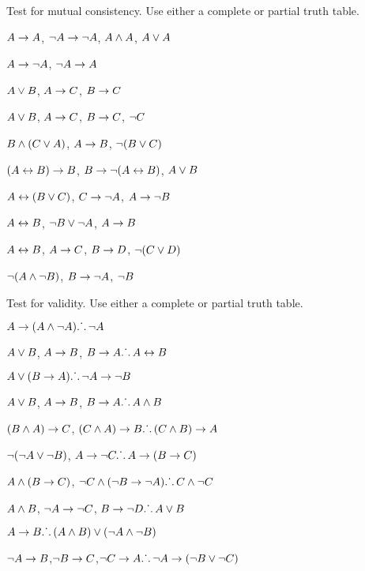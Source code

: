 \documentclass[PHIL101-Textbook.tex]{subfiles}
\begin{document}
\noindent\problempart
\label{pr.TT.consistent5}
Test for mutual consistency. Use either a complete or partial truth table.
\begin{earg}
\item $A\rightarrow A$, $\neg A \rightarrow \neg A$, $A\land A$, $A\vee A$ %
\item $A \rightarrow \neg A$, $\neg A \rightarrow A$%
\item $A\vee B$, $A\rightarrow C$, $B\rightarrow C$ %
\item $A \vee B$, $A \rightarrow C$, $B \rightarrow C$, $\neg C$ %
\item $B\land(C\vee A)$, $A\rightarrow B$, $\neg(B\vee C)$  %
\item $(A \leftrightarrow B) \rightarrow B$,  $B \rightarrow \neg (A \leftrightarrow B)$, $A \vee B$  %
\item $A\leftrightarrow(B\vee C)$, $C\rightarrow \neg A$, $A\rightarrow \neg B$ %
\item  $A \leftrightarrow B$,  $\neg B \vee \neg A$,  $A \rightarrow  B$ %
\item $A \leftrightarrow B$, $A \rightarrow C$, $B \rightarrow D$, $\neg(C \vee D)$ %
\item $\neg (A \land \neg B)$,  $B \rightarrow \neg A$, $\neg B$   %
\end{earg}

\noindent\problempart Test for validity. Use either a complete or partial truth table.

\label{pr.TT.valid5} 
\begin{earg}
\item $A\rightarrow(A\land\neg A)\ldotp\dot{}\,\ldotp \neg A$%
\item $A \vee B$, $A \rightarrow B$, $B \rightarrow A \ldotp\dot{}\,\ldotp  A \leftrightarrow B$  %
\item $A\vee(B\rightarrow A)\ldotp\dot{}\,\ldotp \neg A \rightarrow \neg B$ %
\item $A \vee B$, $A \rightarrow B$, $ B \rightarrow A \ldotp\dot{}\,\ldotp  A \land B$ %
\item $(B\land A)\rightarrow C$, $(C\land A)\rightarrow B\ldotp\dot{}\,\ldotp (C\land B)\rightarrow A$ %
\item $\neg (\neg A \vee \neg B)$, $A \rightarrow \neg C \ldotp\dot{}\,\ldotp  A \rightarrow (B \rightarrow C)$ %
\item $A \land (B \rightarrow C)$, $\neg C \land (\neg B \rightarrow \neg A)\ldotp\dot{}\,\ldotp C \land \neg C$ %
\item $A \land B$, $\neg A \rightarrow \neg C$, $B \rightarrow \neg D \ldotp\dot{}\,\ldotp  A \vee B$ %
\item $A \rightarrow B\ldotp\dot{}\,\ldotp (A \land B) \vee (\neg A \land \neg B)$ %
\item $\neg A \rightarrow B$,$ \neg B \rightarrow C $,$ \neg C \rightarrow A \ldotp\dot{}\,\ldotp  \neg A \rightarrow (\neg B \vee \neg C) $%

\end{earg}
\end{document}
